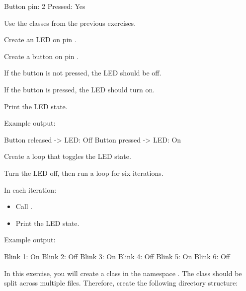 \begin{console}
Button pin: 2
Pressed: Yes
\end{console}

\label{c2:set:2}

\label{c2:ex:2.1}
Use the classes from the previous exercises.

\begin{parts}
  \item Create an LED on pin .
  \item Create a button on pin .
  \item If the button is not pressed, the LED should be off.
  \item If the button is pressed, the LED should turn on.
  \item Print the LED state.
\end{parts}
Example output:

\begin{console}
Button released -> LED: Off
Button pressed  -> LED: On
\end{console}

\label{c2:ex:2.2}
Create a loop that toggles the LED state.

\begin{parts}
  \item Turn the LED off, then run a loop for six iterations.
  \item In each iteration:
  \begin{itemize}
    \item Call .
    \item Print the LED state.
  \end{itemize}
\end{parts}
Example output:

\begin{console}
Blink 1: On
Blink 2: Off
Blink 3: On
Blink 4: Off
Blink 5: On
Blink 6: Off
\end{console}

\label{c2:set:3}

\label{c2:ex:3.1}
In this exercise, you will create a class  in the namespace . The class
should be split across multiple files. Therefore, create the following directory structure:

